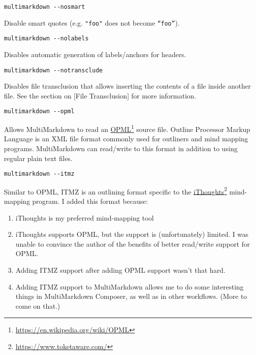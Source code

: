 \begin{verbatim}
multimarkdown --nosmart
\end{verbatim}

Disable smart quotes (e.g. \texttt{"foo"} does not become \texttt{“foo”}).

\begin{verbatim}
multimarkdown --nolabels
\end{verbatim}

Disables automatic generation of labels\slash{}anchors for headers.

\begin{verbatim}
multimarkdown --notransclude
\end{verbatim}

Disables file transclusion that allows inserting the contents of a file inside another file. See the section on {[File Transclusion]} for more information.

\begin{verbatim}
multimarkdown --opml
\end{verbatim}

Allows MultiMarkdown to read an \href{https://en.wikipedia.org/wiki/OPML}{OPML}\footnote{\href{https://en.wikipedia.org/wiki/OPML}{https:\slash{}\slash{}en.wikipedia.org\slash{}wiki\slash{}OPML}} source file. Outline Processor Markup Language is an XML file format commonly used for outliners and mind mapping programs. MultiMarkdown can read\slash{}write to this format in addition to using regular plain text files.

\begin{verbatim}
multimarkdown --itmz
\end{verbatim}

Similar to OPML, ITMZ is an outlining format specific to the \href{https://www.toketaware.com/}{iThoughts}\footnote{\href{https://www.toketaware.com/}{https:\slash{}\slash{}www.toketaware.com\slash{}}} mind-mapping program. I added this format because:

\begin{enumerate}
\item iThoughts is my preferred mind-mapping tool

\item iThoughts supports OPML, but the support is (unfortunately) limited. I was unable to convince the author of the benefits of better read\slash{}write support for OPML.

\item Adding ITMZ support after adding OPML support wasn't that hard.

\item Adding ITMZ support to MultiMarkdown allows me to do some interesting things in MultiMarkdown Composer, as well as in other workflows. (More to come on that.)

\end{enumerate}

